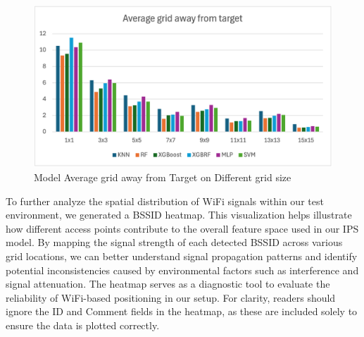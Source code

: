 \documentclass[conference]{IEEEtran}
\begin{document}
	\begin{figure}[htbp]
		\centerline{\includegraphics[scale=0.65]{image1.png}}
		\caption{Model Average grid away from Target on Different grid size}
		\label{fig2}
	\end{figure}
	
	To further analyze the spatial distribution of WiFi signals within our test environment, we generated a BSSID heatmap. This visualization helps illustrate how different access points contribute to the overall feature space used in our IPS model. By mapping the signal strength of each detected BSSID across various grid locations, we can better understand signal propagation patterns and identify potential inconsistencies caused by environmental factors such as interference and signal attenuation. The heatmap serves as a diagnostic tool to evaluate the reliability of WiFi-based positioning in our setup. For clarity, readers should ignore the ID and Comment fields in the heatmap, as these are included solely to ensure the data is plotted correctly.
	
\end{document}
